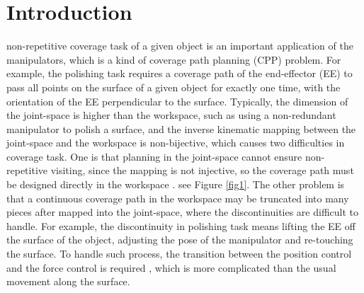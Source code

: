 \documentclass[journal]{IEEEtran}
\begin{document}
\section{Introduction}
% 
% 
% 
% 
 non-repetitive coverage task of a given object is an important application of the manipulators, which is a kind of coverage path planning (CPP) problem. 
For example, the polishing task requires a coverage path of the end-effector (EE) to pass all points on the surface of a given object for exactly one time, with the orientation of the EE perpendicular to the surface. 
Typically, the dimension of the joint-space is higher than the workspace, such as using a non-redundant manipulator to polish a surface, and the inverse kinematic mapping between the joint-space and the workspace is non-bijective, which causes two difficulties in coverage task. One is that planning in the joint-space cannot ensure non-repetitive visiting, since the mapping is not injective, so the coverage path must be designed directly in the workspace \cite{Oriolo2005Motion}. see Figure \ref{fig1}. The other problem is that a continuous coverage path in the workspace may be truncated into many pieces after mapped into the joint-space, where the discontinuities are difficult to handle. For example, the discontinuity in polishing task means lifting the EE off the surface of the object, adjusting the pose of the manipulator and re-touching the surface. To handle such process, the transition between the position control and the force control is required \cite{cheah2003brief} \cite{heck2015switched} \cite{mirrazavi2018a}, which is more complicated than the usual movement along the surface.
\end{document}
